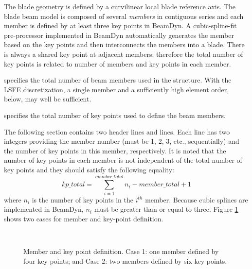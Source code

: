 The blade geometry is defined by a curvilinear local blade reference axis. The blade beam model is composed of several {\it members} in contiguous series and each member is defined by at least three key points in BeamDyn. 
A cubic-spline-fit pre-processor implemented in BeamDyn automatically generates the member based on the key points and then interconnects the members into a blade. 
There is always a shared key point at adjacent members; therefore the total number of key points is related to number of members and key points in each member.

 specifies the total number of beam members used in the structure. 
With the LSFE discretization, a single member and a sufficiently high element order,  below, may well be sufficient.

 specifies the total number of key points used to define the beam members.   

The following section contains two header lines and  lines. 
Each line has two integers providing the member number (must be 1, 2, 3, etc., sequentially) and the number of key points in this member, respectively. 
It is noted that the number of key points in each member is not independent of the total number of key points and they should satisfy the following equality:
\begin{equation}
    \label{Keypoint}
    kp\_total = \sum_{i=1}^{member\_total} n_i - member\_total +1
\end{equation}
where $n_i$ is the number of key points in the $i^{th}$ member. 
Because cubic splines are implemented in BeamDyn, $n_i$ must be greater than or equal to three. 
Figure \ref{fig:Geometry1} shows two cases for member and key-point definition.
\begin{figure}[h!tp]
\centering
    \\
    \caption{Member and key point definition. Case 1: one member defined by four key points; and Case 2: two members defined by six key points.}
    \label{fig:Geometry1}
\end{figure}

